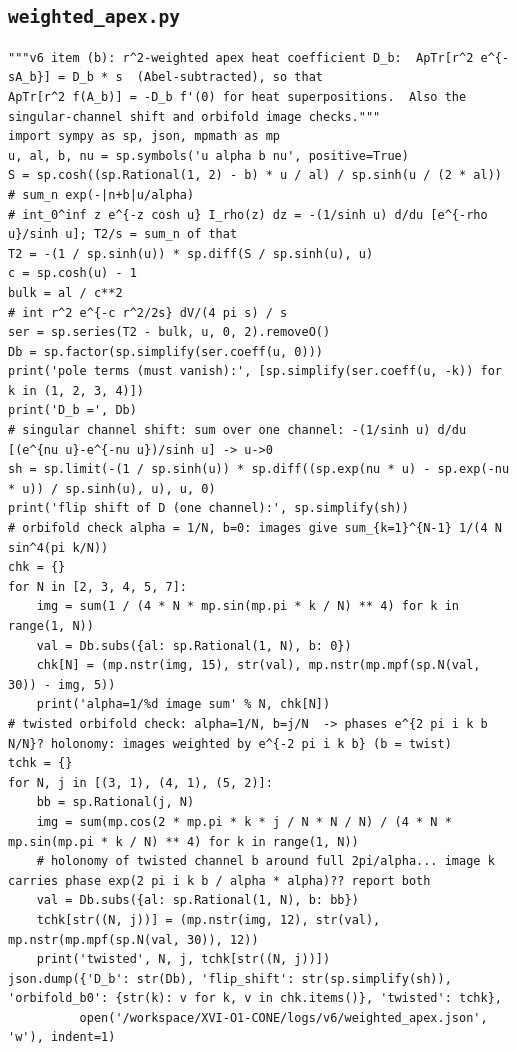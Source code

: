 \documentclass[10pt]{article}
\begin{document}
\subsection{\texttt{weighted\_apex.py}}
\begin{lstlisting}
"""v6 item (b): r^2-weighted apex heat coefficient D_b:  ApTr[r^2 e^{-sA_b}] = D_b * s  (Abel-subtracted), so that
ApTr[r^2 f(A_b)] = -D_b f'(0) for heat superpositions.  Also the singular-channel shift and orbifold image checks."""
import sympy as sp, json, mpmath as mp
u, al, b, nu = sp.symbols('u alpha b nu', positive=True)
S = sp.cosh((sp.Rational(1, 2) - b) * u / al) / sp.sinh(u / (2 * al))          # sum_n exp(-|n+b|u/alpha)
# int_0^inf z e^{-z cosh u} I_rho(z) dz = -(1/sinh u) d/du [e^{-rho u}/sinh u]; T2/s = sum_n of that
T2 = -(1 / sp.sinh(u)) * sp.diff(S / sp.sinh(u), u)
c = sp.cosh(u) - 1
bulk = al / c**2                                                            # int r^2 e^{-c r^2/2s} dV/(4 pi s) / s
ser = sp.series(T2 - bulk, u, 0, 2).removeO()
Db = sp.factor(sp.simplify(ser.coeff(u, 0)))
print('pole terms (must vanish):', [sp.simplify(ser.coeff(u, -k)) for k in (1, 2, 3, 4)])
print('D_b =', Db)
# singular channel shift: sum over one channel: -(1/sinh u) d/du [(e^{nu u}-e^{-nu u})/sinh u] -> u->0
sh = sp.limit(-(1 / sp.sinh(u)) * sp.diff((sp.exp(nu * u) - sp.exp(-nu * u)) / sp.sinh(u), u), u, 0)
print('flip shift of D (one channel):', sp.simplify(sh))
# orbifold check alpha = 1/N, b=0: images give sum_{k=1}^{N-1} 1/(4 N sin^4(pi k/N))
chk = {}
for N in [2, 3, 4, 5, 7]:
    img = sum(1 / (4 * N * mp.sin(mp.pi * k / N) ** 4) for k in range(1, N))
    val = Db.subs({al: sp.Rational(1, N), b: 0})
    chk[N] = (mp.nstr(img, 15), str(val), mp.nstr(mp.mpf(sp.N(val, 30)) - img, 5))
    print('alpha=1/%d image sum' % N, chk[N])
# twisted orbifold check: alpha=1/N, b=j/N  -> phases e^{2 pi i k b N/N}? holonomy: images weighted by e^{-2 pi i k b} (b = twist)
tchk = {}
for N, j in [(3, 1), (4, 1), (5, 2)]:
    bb = sp.Rational(j, N)
    img = sum(mp.cos(2 * mp.pi * k * j / N * N / N) / (4 * N * mp.sin(mp.pi * k / N) ** 4) for k in range(1, N))
    # holonomy of twisted channel b around full 2pi/alpha... image k carries phase exp(2 pi i k b / alpha * alpha)?? report both
    val = Db.subs({al: sp.Rational(1, N), b: bb})
    tchk[str((N, j))] = (mp.nstr(img, 12), str(val), mp.nstr(mp.mpf(sp.N(val, 30)), 12))
    print('twisted', N, j, tchk[str((N, j))])
json.dump({'D_b': str(Db), 'flip_shift': str(sp.simplify(sh)), 'orbifold_b0': {str(k): v for k, v in chk.items()}, 'twisted': tchk},
          open('/workspace/XVI-O1-CONE/logs/v6/weighted_apex.json', 'w'), indent=1)
\end{lstlisting}
\end{document}
